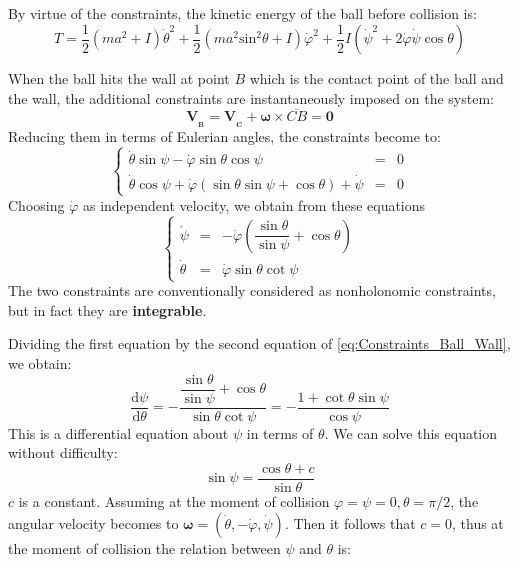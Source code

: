 \documentclass[preprint,12pt]{elsarticle}
\renewcommand{\vec}[1]{\boldsymbol{#1}}
\newcommand{\dif}{\mathrm{d}}
\begin{document}
By virtue of the constraints, the kinetic energy of the ball before collision is:
 \begin{equation}\label{eq:KineticEnergy_Ball_RoughPlain}
  T=\frac{1}{2}(m a^2+I)\dot{\theta}^2+\frac{1}{2}(m a^2\mathrm{sin}^2\theta+I)\dot{\varphi}^2+\frac{1}{2}I(\dot{\psi}^2+2\dot{\varphi}\dot{\psi}\cos\theta)
 \end{equation}

When the ball hits the wall at point $B$ which is the contact point of the ball and the wall, the additional constraints are instantaneously imposed on the system:
\begin{equation}
  \vec {V_{_B}}=\vec {V_{_C}}+\vec{\omega} \times \overline{CB}=\vec{0}
\end{equation}
Reducing them in terms of Eulerian angles, the constraints become to:
\begin{equation}
 \left\{\begin{array}{rcl}
 \dot \theta \sin \psi  - \dot \varphi \sin \theta \cos \psi & = &0\\
 \dot \theta \cos \psi  + \dot \varphi (\sin \theta \sin \psi  +\cos \theta ) +\dot \psi & = &0
 \end{array}\right.
\end{equation}
Choosing $\dot{\varphi}$ as independent velocity, we obtain from these equations
\begin{equation}\label{eq:Constraints_Ball_Wall}
 \left\{\begin{array}{rcl}
 \dot \psi & =&- \dot \varphi \left(\dfrac{\sin \theta }{\sin \psi } + \cos \theta \right)\\
 \dot \theta & = &\dot \varphi \sin \theta \cot \psi
 \end{array}\right.
\end{equation}
The two constraints are conventionally considered as nonholonomic constraints\cite{Neimark}, but in fact they are \textbf{integrable}.

Dividing the first equation by the second equation of \eqref{eq:Constraints_Ball_Wall}, we obtain:
\begin{equation}
  \dfrac{\dif\psi}{\dif\theta}=-\dfrac{\dfrac{\sin\theta}{\sin\psi}+\cos\theta}{\sin\theta \cot\psi}=-\dfrac{1+\cot\theta \sin\psi}{\cos \psi}
\end{equation}
This is a differential equation about $\psi$ in terms of $\theta$.
We can solve this equation without difficulty:
\begin{equation}
  \sin \psi =\frac{\cos \theta+c}{\sin \theta}
\end{equation}
$c$ is a constant. Assuming at the moment of collision $\varphi=\psi=0, \theta=\pi/2 $, the angular velocity becomes to $\vec{\omega}=(\dot{\theta},-\dot{\varphi},\dot{\psi})$. Then it follows that $c=0$, thus at the moment of collision the relation between $\psi$ and $\theta$ is:
\end{document}
